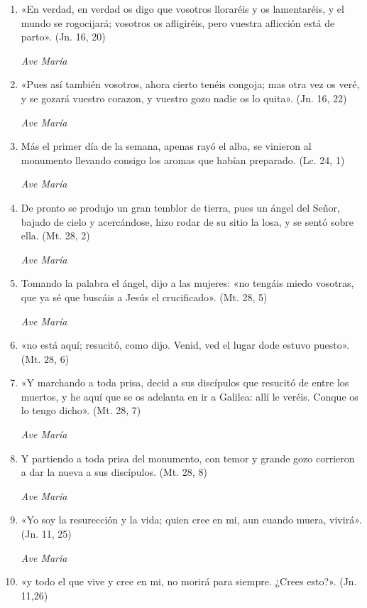 \documentclass[a4paper,11pt, oneside]{report}
\begin{document}
      \begin{enumerate}
        
        \item «En verdad, en verdad os digo que vosotros lloraréis y os lamentaréis, y el mundo se rogocijará;
        vosotros os afligiréis, pero vuestra aflicción está de parto». (Jn. 16, 20)

        \textit{Ave María}

        \item «Pues así también vosotros, ahora cierto tenéis congoja; mas otra vez os veré, y se gozará vuestro corazon,
        y vuestro gozo nadie os lo quita». (Jn. 16, 22)

        \textit{Ave María}

        \item Más el primer día de la semana, apenas rayó el alba, se vinieron al monumento llevando consigo los aromas
        que habían preparado. (Lc. 24, 1)

        \textit{Ave María}

        \item De pronto se produjo un gran temblor de tierra, pues un ángel del Señor, bajado de cielo y acercándose, hizo rodar
        de su sitio la losa, y se sentó sobre ella. (Mt. 28, 2)
        
        \textit{Ave María}

        \item Tomando la palabra el ángel, dijo a las mujeres: «no tengáis miedo vosotras, que ya sé que buscáis a Jesús el crucificado». (Mt. 28, 5)

        \textit{Ave María}

        \item «no está aquí; resucitó, como dijo. Venid, ved el lugar dode estuvo puesto». (Mt. 28, 6)

        \item «Y marchando a toda prisa, decid a sus discípulos que resucitó de entre los muertos, y he aquí que se os adelanta en ir a Galilea:
        allí le veréis. Conque os lo tengo dicho». (Mt. 28, 7)

        \textit{Ave María}

        \item Y partiendo a toda prisa del monumento, con temor y grande gozo corrieron a dar la nueva a sus discípulos. (Mt. 28, 8)

        \textit{Ave María}

        \item «Yo soy la resurección y la vida; quien cree en mi, aun cuando muera, vivirá». (Jn. 11, 25)

        \textit{Ave María}

        \item «y todo el que vive y cree en mi, no morirá para siempre. ¿Crees esto?». (Jn. 11,26)
        
      \end{enumerate}
\end{document}
